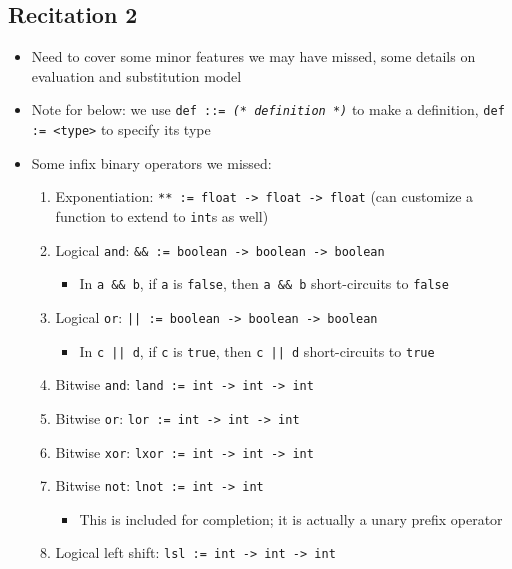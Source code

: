 \subsection*{Recitation 2}

\begin{itemize}
    \item Need to cover some minor features we may have missed, some details on evaluation and substitution model
    \item Note for below: we use \texttt{def ::= \textit{(* definition *)}} to make a definition, \texttt{def := <type>} to specify its type
    \item Some infix binary operators we missed:
    \begin{enumerate}
        \item Exponentiation: \texttt{** := float -> float -> float} (can customize a function to extend to \texttt{int}s as well)
        \item Logical \texttt{and}: \texttt{\&\& := boolean -> boolean -> boolean}
        \begin{itemize}
            \item In \texttt{a \&\& b}, if \texttt{a} is \texttt{false}, then \texttt{a \&\& b} short-circuits to \texttt{false}
        \end{itemize}
        \item Logical \texttt{or}: \texttt{|| := boolean -> boolean -> boolean}
        \begin{itemize}
            \item In \texttt{c || d}, if \texttt{c} is \texttt{true}, then \texttt{c || d} short-circuits to \texttt{true}
        \end{itemize}
        \item Bitwise \texttt{and}: \texttt{land := int -> int -> int}
        \item Bitwise \texttt{or}: \texttt{lor := int -> int -> int}
        \item Bitwise \texttt{xor}: \texttt{lxor := int -> int -> int}
        \item Bitwise \texttt{not}: \texttt{lnot := int -> int}
        \begin{itemize}
            \item This is included for completion; it is actually a unary prefix operator
        \end{itemize}
        \item Logical left shift: \texttt{lsl := int -> int -> int}
        \begin{itemize}

\end{itemize}
\end{enumerate}
\end{itemize}
